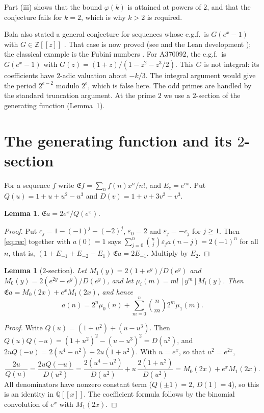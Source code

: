 \documentclass[11pt]{amsart}
\newtheorem{lemma}[theorem]{Lemma}
\theoremstyle{remark}
\newcommand{\Z}{\mathbb{Z}}
\newcommand{\Q}{\mathbb{Q}}
\begin{document}
Part (iii) shows that the bound $\varphi(k)$ is attained at powers of $2$, and that the conjecture fails for $k=2$, which is why $k>2$ is required.

Bala also stated a general conjecture for sequences whose e.g.f.\ is $G(e^x-1)$ with $G\in\Z[[z]]$ \cite[A000670]{OEIS}.
That case is now proved (see \cite[\S2]{Kallat} and the Lean development \cite{Omega}); the classical example is the Fubini numbers \cite{Barsky,Gross}.
For A370092, the e.g.f.\ is $G(e^x-1)$ with $G(z)=(1+z)/(1-z^2-z^3/2)$.
This $G$ is not integral: its coefficients have $2$-adic valuation about $-k/3$.
The integral argument would give the period $2^{e-2}$ modulo $2^e$, which is false here.
The odd primes are handled by the standard truncation argument.
At the prime $2$ we use a $2$-section of the generating function (Lemma~\ref{lem:section}).

\section{The generating function and its $2$-section}

For a sequence $f$ write $\mathfrak Ef=\sum_nf(n)x^n/n!$, and $E_c=e^{cx}$.
Put $Q(u)=1+u+u^2-u^3$ and $D(v)=1+v+3v^2-v^3$.

\begin{lemma}\label{lem:egf}
$\mathfrak Ea=2e^x/Q(e^x)$.
\end{lemma}

\begin{proof}
Put $c_j=1-(-1)^j-(-2)^j$, $\varepsilon_0=2$ and $\varepsilon_j=-c_j$ for $j\ge1$.
Then \eqref{eq:rec} together with $a(0)=1$ says $\sum_{j=0}^n\binom nj\varepsilon_ja(n-j)=2(-1)^n$ for all $n$, that is, $(1+E_{-1}+E_{-2}-E_1)\,\mathfrak Ea=2E_{-1}$.
Multiply by $E_2$.
\end{proof}

\begin{lemma}[$2$-section]\label{lem:section}
Let $M_1(y)=2(1+e^y)/D(e^y)$ and $M_0(y)=2(e^{2y}-e^y)/D(e^y)$, and let $\mu_i(m)=m!\,[y^m]M_i(y)$.
Then $\mathfrak Ea=M_0(2x)+e^xM_1(2x)$, and hence
\begin{equation}\label{eq:section}
a(n)=2^n\mu_0(n)+\sum_{m=0}^n\binom nm2^m\mu_1(m).
\end{equation}
\end{lemma}

\begin{proof}
Write $Q(u)=(1+u^2)+(u-u^3)$.
Then $Q(u)Q(-u)=(1+u^2)^2-(u-u^3)^2=D(u^2)$, and $2uQ(-u)=2(u^4-u^2)+2u(1+u^2)$.
With $u=e^x$, so that $u^2=e^{2x}$,
\[
\frac{2u}{Q(u)}=\frac{2uQ(-u)}{D(u^2)}=\frac{2(u^4-u^2)}{D(u^2)}+u\,\frac{2(1+u^2)}{D(u^2)}=M_0(2x)+e^xM_1(2x).
\]
All denominators have nonzero constant term ($Q(\pm1)=2$, $D(1)=4$), so this is an identity in $\Q[[x]]$.
The coefficient formula follows by the binomial convolution of $e^x$ with $M_1(2x)$.
\end{proof}
\end{document}
